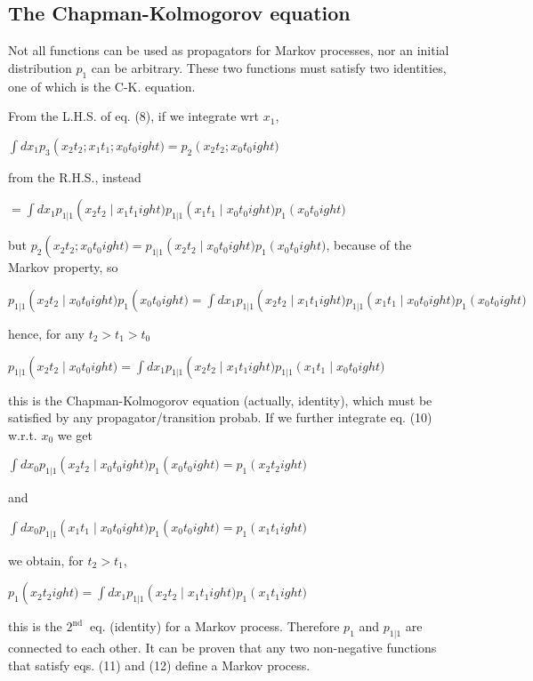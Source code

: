 \subsection*{The Chapman-Kolmogorov equation}
Not all functions can be used as propagators for Markov processes, nor an initial distribution $p_{1}$ can be arbitrary. These two functions must satisfy two identities, one of which is the C-K. equation.

From the L.H.S. of eq. (8), if we integrate wrt $x_1$,
\begin{DispWithArrows}
    $\int d x_{1} p_{3}
\left(x_{2} t_{2} ; x_{1} t_{1} ; x_{0} t_{0}
ight)=p_{2}
\left(x_{2} t_{2} ; x_{0} t_{0}
ight)$
\end{DispWithArrows}
from the R.H.S., instead
\begin{DispWithArrows}
    $=\int d x_{1} p_{1|1}
\left(x_{2} t_{2} 
\mid x_{1} t_{1}
ight) p_{1|1}
\left(x_{1} t_{1} 
\mid x_{0} t_{0}
ight) p_{1}
\left(x_{0} t_{0}
ight)$
\end{DispWithArrows}
but $p_{2}
\left(x_{2} t_{2} ; x_{0} t_{0}
ight)=p_{1|1}
\left(x_{2} t_{2} 
\mid x_{0} t_{0}
ight) p_{1}
\left(x_{0} t_{0}
ight)$, because of the Markov property, so
\begin{DispWithArrows}[tag=10]
    $p_{1|1}
\left(x_{2} t_{2} 
\mid x_{0} t_{0}
ight) p_{1}
\left(x_{0} t_{0}
ight)=\int d x_{1} p_{1|1}
\left(x_{2} t_{2} 
\mid x_{1} t_{1}
ight) p_{1|1}
\left(x_{1} t_{1} 
\mid x_{0} t_{0}
ight) p_{1}
\left(x_{0} t_{0}
ight)$
\end{DispWithArrows}
hence, for any $t_{2}>t_{1}>t_{0}$
\begin{DispWithArrows}[tag=11]
    $p_{1|1}
\left(x_{2} t_{2} 
\mid x_{0} t_{0}
ight)=\int d x_{1} p_{1|1}
\left(x_{2} t_{2} 
\mid x_{1} t_{1}
ight) p_{1|1}
\left(x_{1} t_{1} 
\mid x_{0} t_{0}
ight)$
\end{DispWithArrows}
this is the Chapman-Kolmogorov equation (actually, identity), which must be satisfied by any propagator/transition probab. If we further integrate eq. (10) w.r.t. $x_{0}$ we get
\begin{DispWithArrows}
    $\int d x_{0} p_{1|1}
\left(x_{2} t_{2} 
\mid x_{0} t_{0}
ight) p_{1}
\left(x_{0} t_{0}
ight)=p_{1}
\left(x_{2} t_{2}
ight)$
\end{DispWithArrows}
and
\begin{DispWithArrows}
    $\int d x_{0} p_{1|1}
\left(x_{1} t_{1} 
\mid x_{0} t_{0}
ight) p_{1}
\left(x_{0} t_{0}
ight)=p_{1}
\left(x_{1} t_{1}
ight)$
\end{DispWithArrows}
we obtain, for $t_{2}>t_{1}$,
\begin{DispWithArrows}[tag=12]
    $p_{1}
\left(x_{2} t_{2}
ight)=\int d x_{1} p_{1|1}
\left(x_{2} t_{2} 
\mid x_{1} t_{1}
ight) p_{1}
\left(x_{1} t_{1}
ight)$
\end{DispWithArrows}
this is the $2^{\text {nd }}$ eq. (identity) for a Markov process. Therefore $p_{1}$ and $p_{1|1}$ are connected to each other.
It can be proven that any two non-negative functions that satisfy eqs. (11) and (12) define a Markov process.

